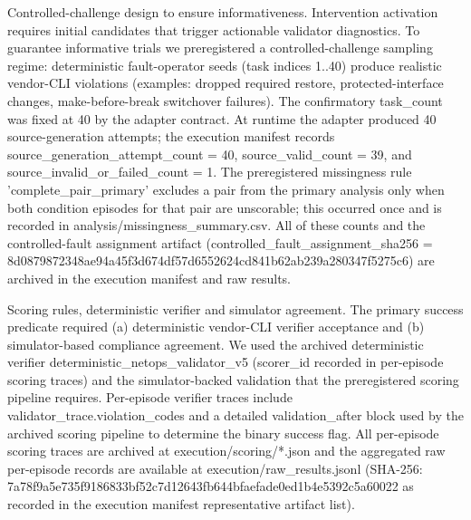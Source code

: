 \documentclass[conference]{IEEEtran}
\begin{document}
Controlled-challenge design to ensure informativeness. Intervention activation requires initial candidates that trigger actionable validator diagnostics. To guarantee informative trials we preregistered a controlled-challenge sampling regime: deterministic fault-operator seeds (task indices 1..40) produce realistic vendor-CLI violations (examples: dropped required restore, protected-interface changes, make-before-break switchover failures). The confirmatory task\_count was fixed at 40 by the adapter contract. At runtime the adapter produced 40 source-generation attempts; the execution manifest records source\_generation\_attempt\_count = 40, source\_valid\_count = 39, and source\_invalid\_or\_failed\_count = 1. The preregistered missingness rule 'complete\_pair\_primary' excludes a pair from the primary analysis only when both condition episodes for that pair are unscorable; this occurred once and is recorded in analysis/missingness\_summary.csv. All of these counts and the controlled-fault assignment artifact (controlled\_fault\_assignment\_sha256 = 8d087987\allowbreak{}2348ae94\allowbreak{}a45f3d67\allowbreak{}4df57d65\allowbreak{}52624cd8\allowbreak{}41b62ab2\allowbreak{}39a28034\allowbreak{}7f5275c6) are archived in the execution manifest and raw results.

Scoring rules, deterministic verifier and simulator agreement. The primary success predicate required (a) deterministic vendor-CLI verifier acceptance and (b) simulator-based compliance agreement. We used the archived deterministic verifier deterministic\_netops\_validator\_v5 (scorer\_id recorded in per-episode scoring traces) and the simulator-backed validation that the preregistered scoring pipeline requires. Per-episode verifier traces include validator\_trace.violation\_codes and a detailed validation\_after block used by the archived scoring pipeline to determine the binary success flag. All per-episode scoring traces are archived at execution/scoring/*.json and the aggregated raw per-episode records are available at execution/raw\_results.jsonl (SHA-256: 7a78f9a5\allowbreak{}e735f918\allowbreak{}6833bf52\allowbreak{}c7d12643\allowbreak{}fb644bfa\allowbreak{}efade0ed\allowbreak{}1b4e5392\allowbreak{}c5a60022 as recorded in the execution manifest representative artifact list).
\end{document}
